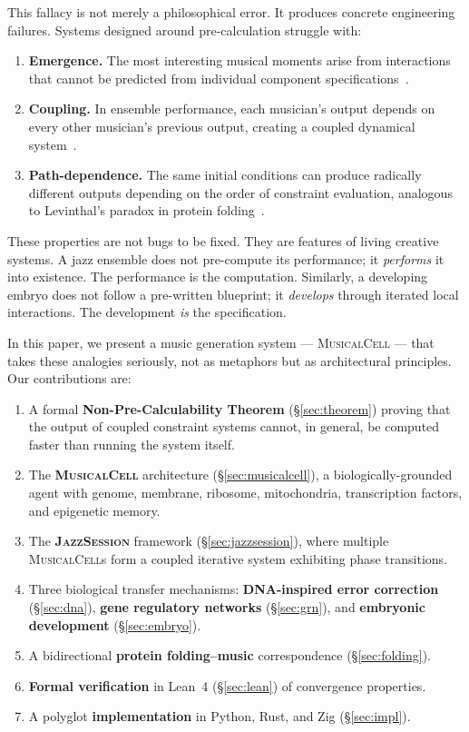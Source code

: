 \documentclass[11pt,a4paper]{article}
\newcommand{\MusicalCell}{\textsc{MusicalCell}}
\newcommand{\JazzSession}{\textsc{JazzSession}}
\begin{document}
This fallacy is not merely a philosophical error. It produces concrete engineering failures. Systems designed around pre-calculation struggle with:

\begin{enumerate}[leftmargin=*]
  \item \textbf{Emergence.} The most interesting musical moments arise from interactions that cannot be predicted from individual component specifications~\citep{pressing1988}.
  \item \textbf{Coupling.} In ensemble performance, each musician's output depends on every other musician's previous output, creating a coupled dynamical system~\citep{berliner1994}.
  \item \textbf{Path-dependence.} The same initial conditions can produce radically different outputs depending on the order of constraint evaluation, analogous to Levinthal's paradox in protein folding~\citep{levinthal1969}.
\end{enumerate}

These properties are not bugs to be fixed. They are features of living creative systems. A jazz ensemble does not pre-compute its performance; it \emph{performs} it into existence. The performance is the computation. Similarly, a developing embryo does not follow a pre-written blueprint; it \emph{develops} through iterated local interactions. The development \emph{is} the specification.

In this paper, we present a music generation system --- \MusicalCell{} --- that takes these analogies seriously, not as metaphors but as architectural principles. Our contributions are:

\begin{enumerate}[leftmargin=*]
  \item A formal \textbf{Non-Pre-Calculability Theorem} (\S\ref{sec:theorem}) proving that the output of coupled constraint systems cannot, in general, be computed faster than running the system itself.
  \item The \textbf{\MusicalCell{}} architecture (\S\ref{sec:musicalcell}), a biologically-grounded agent with genome, membrane, ribosome, mitochondria, transcription factors, and epigenetic memory.
  \item The \textbf{\JazzSession{}} framework (\S\ref{sec:jazzsession}), where multiple \MusicalCell{}s form a coupled iterative system exhibiting phase transitions.
  \item Three biological transfer mechanisms: \textbf{DNA-inspired error correction} (\S\ref{sec:dna}), \textbf{gene regulatory networks} (\S\ref{sec:grn}), and \textbf{embryonic development} (\S\ref{sec:embryo}).
  \item A bidirectional \textbf{protein folding--music} correspondence (\S\ref{sec:folding}).
  \item \textbf{Formal verification} in Lean~4 (\S\ref{sec:lean}) of convergence properties.
  \item A polyglot \textbf{implementation} in Python, Rust, and Zig (\S\ref{sec:impl}).
\end{enumerate}
\end{document}
